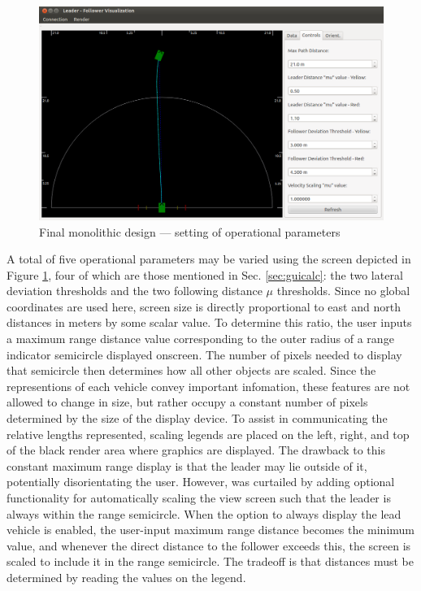 \begin{figure}[ht] \centering
    \includegraphics[width=5in]{./figs/final_design_opts.png}
    \caption{Final monolithic design --- setting of operational parameters} \label{fig:finaldesopts}
\end{figure}

A total of five operational parameters may be varied using the screen depicted in Figure \ref{fig:finaldesopts}, four of which are those mentioned in Sec. \ref{sec:guicalc}: the two lateral deviation thresholds and the two following distance $\mu$ thresholds. Since no global coordinates are used here, screen size is directly proportional to east and north distances in meters by some scalar value. To determine this ratio, the user inputs a maximum range distance value corresponding to the outer radius of a range indicator semicircle displayed onscreen. The number of pixels needed to display that semicircle then determines how all other objects are scaled. Since the representions of each vehicle convey important infomation, these features are not allowed to change in size, but rather occupy a constant number of pixels determined by the size of the display device. To assist in communicating the relative lengths represented, scaling legends are placed on the left, right, and top of the black render area where graphics are displayed. The drawback to this constant maximum range display is that the leader may lie outside of it, potentially disorientating the user. However, was curtailed by adding optional functionality for automatically scaling the view screen such that the leader is always within the range semicircle. When the option to always display the lead vehicle is enabled, the user-input maximum range distance becomes the minimum value, and whenever the direct distance to the follower exceeds this, the screen is scaled to include it in the range semicircle. The tradeoff is that distances must be determined by reading the values on the legend.

